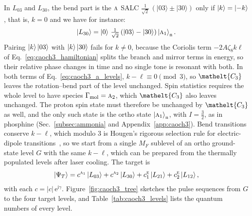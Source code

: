 \documentclass[
  reprint,
  aps,
  prx,
  superscriptaddress,
  amsmath,
  amssymb,
  longbibliography
]{revtex4-2}
\newcommand{\eltfont}[1]{{\let\sigma\eltsigma\mathelt{#1}}}
\newcommand{\irr}[1]{\text{\normalfont\scshape #1}}
\newcommand{\elt}[1]{\eltfont{#1}}
\newcommand{\iunit}{\mathrm{i}}
\newcommand{\expe}{\mathrm{e}}
\newcommand{\occ}[1]{\lvert #1\rangle}
\providecommand{\Gmol}{\Gamma_{\mathrm{mol}}}
\begin{document}
In $L_{03}$ and $L_{30}$, the bend part is the $\irr{a}$ SALC $\tfrac{1}{\sqrt{2}}\,(\occ{03}\pm\occ{30})$ only if $\ket{k}=\ket{-k}$, that is, $k=0$ and we have for instance:
\begin{equation}
\ket{L_{30}}=\ket{0}\,\tfrac{1}{\sqrt{2}}\,(\occ{03}-\occ{30})\ket{\irr{a}_{1}}_{\mathrm{n}} .
\label{eq:caoch3_a_levels}
\end{equation}
Pairing $\ket{k}\occ{03}$ with $\ket{k}\occ{30}$ fails for $k\neq0$, because the Coriolis term $-2A\zeta_8k\ell$ of Eq.~\eqref{eq:caoch3_hamiltonian} splits the branch and mirror terms in energy, so their relative phase changes in time and no single tone is resonant with both. In both terms of Eq.~\eqref{eq:caoch3_a_levels}, $k-\ell\equiv0\pmod3$, so $\elt{C_{3}}$ leaves the rotation--bend part of the level unchanged. Spin statistics requires the whole level to have species $\Gmol=\irr{a}_{2}$, which $\elt{C_{3}}$ also leaves unchanged. The proton spin state must therefore be unchanged by $\elt{C_{3}}$ as well, and the only such state is the ortho state $\ket{\irr{a}_{1}}_{\mathrm{n}}$, with $I=\tfrac32$, as in phosphine (Sec.~\ref{subsec:ammonia} and Appendix~\ref{app:caoch3}). Bend transitions conserve $k-\ell$, which modulo 3 is Hougen's rigorous selection rule for electric-dipole transitions~\cite{Hougen1962}, so we start from a single $M_F$ sublevel of an ortho ground-state level $G$ with the same $k-\ell$, which can be prepared from the thermally populated levels after laser cooling. The target is
\begin{equation}
\ket{\Psi_T}=c^{\irr{a}_{1}}\ket{L_{03}}+c^{\irr{a}_{2}}\ket{L_{30}}+c^{\irr{e}}_{1}\ket{L_{21}}+c^{\irr{e}}_{2}\ket{L_{12}} ,
\label{eq:caoch3_target}
\end{equation}
with each $c=|c|\,\expe^{\iunit\gamma}$. Figure~\ref{fig:caoch3_tree} sketches the pulse sequences from $G$ to the four target levels, and Table~\ref{tab:caoch3_levels} lists the quantum numbers of every level.
\end{document}
